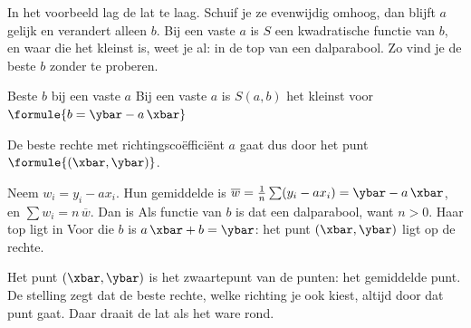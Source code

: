 In het voorbeeld lag de lat te laag. Schuif je ze evenwijdig omhoog, dan blijft $a$ gelijk en verandert alleen $b$. Bij een vaste $a$ is $S$ een kwadratische functie van $b$, en waar die het kleinst is, weet je al: in de top van een dalparabool. Zo vind je de beste $b$ zonder te proberen.


\begin{theorie}
\begin{stelling}{Beste $b$ bij een vaste $a$}
Bij een vaste $a$ is $S(a, b)$ het kleinst voor \quad $\formule{b = \ybar - a\,\xbar}$

\vspace{1mm}
De beste rechte met richtingscoëfficiënt $a$ gaat dus door het punt $\formule{(\xbar, \ybar)}$.
\end{stelling}

\begin{bewijs}
Neem $w_i = y_i - ax_i$. Hun gemiddelde is $\overline{w} = \frac1n \sum (y_i - ax_i) = \ybar - a\,\xbar$, en $\sum w_i = n\,\overline{w}$. Dan is
Als functie van $b$ is dat een dalparabool, want $n > 0$. Haar top ligt in
Voor die $b$ is $a\,\xbar + b = \ybar$: het punt $(\xbar, \ybar)$ ligt op de rechte.
\end{bewijs}
\end{theorie}

Het punt $(\xbar, \ybar)$ is het zwaartepunt van de punten: het gemiddelde punt. De stelling zegt dat de beste rechte, welke richting je ook kiest, altijd door dat punt gaat. Daar draait de lat als het ware rond.


